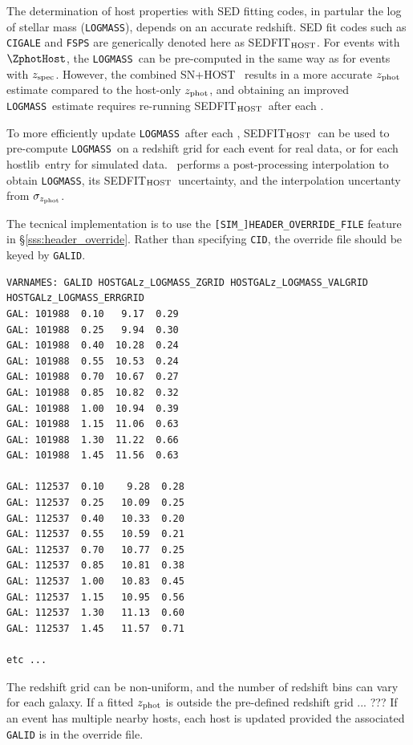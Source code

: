 \documentclass[12pt]{article}
\newcommand{\hostlib}{{\sc hostlib}}
\newcommand{\Zphot}{z_{\rm phot}}
\newcommand{\Zspec}{z_{\rm spec}}
\begin{document}
\newcommand{\SEDFIT}{SEDFIT$_{\rm HOST}$}
\newcommand{\lm}{{\tt LOGMASS}}

The determination of host properties with SED fitting codes, 
in partular the log of stellar mass (\lm), depends on an accurate redshift. 
SED fit codes such as {\tt CIGALE} and {\tt FSPS} are generically denoted
here as \SEDFIT.
For events with $\ZphotHost$, the \lm\ can be pre-computed 
in the same way as for events with $\Zspec$. 
However, the combined SN+HOST \lcfitz\ results in a more accurate $\Zphot$ 
estimate compared to the host-only $\Zphot$, 
and obtaining an improved \lm\ estimate requires re-running
\SEDFIT\ after each \lcfitz.

To more efficiently update \lm\ after each \lcfitz,
\SEDFIT\ can be used to pre-compute \lm\ on a redshift grid for 
each event for real data, or for each \hostlib\ entry for simulated data.
\lcfitz\ performs a post-processing interpolation to obtain \lm, 
its \SEDFIT\ uncertainty, and the interpolation uncertanty
from $\sigma_{\Zphot}$.

\bigskip
The tecnical implementation is to use the \verb|[SIM_]HEADER_OVERRIDE_FILE|
feature in \S\ref{sss:header_override}. Rather than specifying
{\tt CID}, the override file should be keyed by {\tt GALID}.

\begin{verbatim}
VARNAMES: GALID HOSTGALz_LOGMASS_ZGRID HOSTGALz_LOGMASS_VALGRID HOSTGALz_LOGMASS_ERRGRID
GAL: 101988  0.10   9.17  0.29
GAL: 101988  0.25   9.94  0.30
GAL: 101988  0.40  10.28  0.24
GAL: 101988  0.55  10.53  0.24
GAL: 101988  0.70  10.67  0.27
GAL: 101988  0.85  10.82  0.32
GAL: 101988  1.00  10.94  0.39
GAL: 101988  1.15  11.06  0.63
GAL: 101988  1.30  11.22  0.66
GAL: 101988  1.45  11.56  0.63

GAL: 112537  0.10    9.28  0.28
GAL: 112537  0.25   10.09  0.25
GAL: 112537  0.40   10.33  0.20
GAL: 112537  0.55   10.59  0.21
GAL: 112537  0.70   10.77  0.25
GAL: 112537  0.85   10.81  0.38
GAL: 112537  1.00   10.83  0.45
GAL: 112537  1.15   10.95  0.56
GAL: 112537  1.30   11.13  0.60
GAL: 112537  1.45   11.57  0.71

etc ...
\end{verbatim}                                                                                         
%
The redshift grid can be non-uniform, and the number of redshift bins
can vary for each galaxy. If a fitted $\Zphot$ is outside the pre-defined
redshift grid ... ??? If an event has multiple nearby hosts, each
host is updated provided the associated {\tt GALID} is in the override file.
\end{document}
